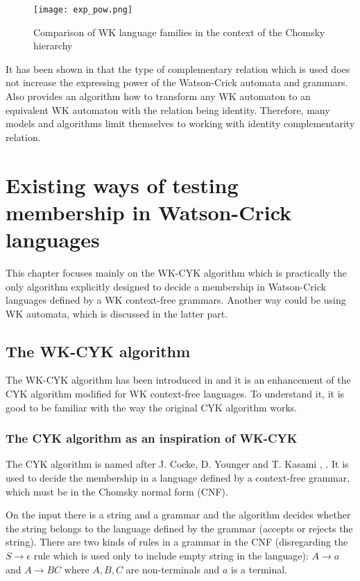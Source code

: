 \begin{figure}[h!]
  \texttt{[image: exp\_pow.png]}
  \centering
  \label{fig:expr-power}
  \caption{Comparison of WK language families in the context of the Chomsky hierarchy}
\end{figure}

It has been shown in \cite{COMPL_REL} that the type of complementary relation which is used does not increase the expressing power of the Watson-Crick automata and grammars. Also \cite{SURVEY} provides an algorithm how to transform any WK automaton to an equivalent WK automaton with the relation being identity. Therefore, many models and algorithms limit themselves to working with identity complementarity relation.

\chapter{Existing ways of testing membership in Watson-Crick languages} \label{chapter:WK_CYK}

This chapter focuses mainly on the WK-CYK algorithm which is practically the only algorithm explicitly designed to decide a membership in Watson-Crick languages defined by a WK context-free grammars. Another way could be using WK automata, which is discussed in the latter part.

\section{The WK-CYK algorithm}
The WK-CYK algorithm has been introduced in \cite{WK_CYK} and it is an enhancement of the CYK algorithm modified for WK context-free languages. To understand it, it is good to be familiar with the way the original CYK algorithm works.

\subsection{The CYK algorithm as an inspiration of WK-CYK}
The CYK algorithm is named after J. Cocke, D. Younger and T. Kasami \cite{CYK1}, \cite{CYK2} \cite{CYK3}. It is used to decide the membership in a language defined by a context-free grammar, which must be in the Chomsky normal form (CNF).

On the input there is a string and a grammar and the algorithm decides whether the string belongs to the language defined by the grammar (accepts or rejects the string). There are two kinds of rules in a grammar in the CNF (disregarding the $S \rightarrow \epsilon$ rule which is used only to include empty string in the language): $A \rightarrow a$ and $A \rightarrow BC$ where $A, B, C$ are non-terminals and $a$ is a terminal.

